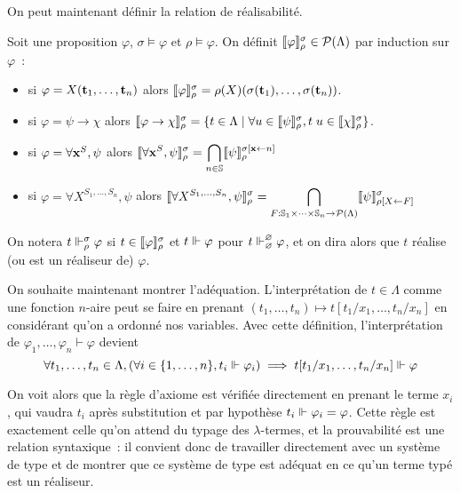 \documentclass{article}
\begin{document}
On peut maintenant définir la relation de réalisabilité.

\begin{defi}
    Soit une proposition $\varphi$, $\sigma\models \varphi$ et $\rho\models \varphi$. On définit $\llbracket \varphi \rrbracket_\rho^\sigma \in \mathcal P(\Lambda)$ par induction sur $\varphi$~:
    \begin{itemize}
        \item si $\varphi = X(\mathbf{t}_1,\ldots,\mathbf{t}_n)$ alors $\llbracket \varphi \rrbracket_\rho^\sigma = \rho(X)(\sigma(\mathbf{t}_1),\ldots,\sigma(\mathbf{t}_n))$.
        \item si $\varphi = \psi \to \chi$ alors $\llbracket \varphi\to\chi \rrbracket_\rho^\sigma = \{t \in \Lambda\mid \forall u \in \llbracket \psi \rrbracket_\rho^\sigma, t\;u \in \llbracket \chi \rrbracket_\rho^\sigma\}$.
        \item si $\varphi = \forall \mathbf{x}^S, \psi$ alors $\displaystyle\llbracket \forall \mathbf{x}^S, \psi \rrbracket_\rho^\sigma = \bigcap_{n \in \mathbb{S}} \llbracket \psi \rrbracket_\rho^{\sigma[\mathbf{x}\leftarrow n]}$
        \item si $\varphi = \forall X^{S_1,\ldots,S_n}, \psi$ alors $\displaystyle\llbracket \forall X^{S_1,\ldots,S_n},\psi \rrbracket_\rho^\sigma = \bigcap_{F : \mathbb{S}_1\times\cdots\times\mathbb{S}_n \to \mathcal P(\Lambda)} \llbracket \psi \rrbracket_{\rho[X\leftarrow F]}^\sigma$
    \end{itemize}

    On notera $t\Vdash_\rho^\sigma \varphi$ si $t\in\llbracket \varphi \rrbracket_\rho^\sigma$ et $t\Vdash\varphi$ pour $t\Vdash_\varnothing^\varnothing\varphi$, et on dira alors que $t$ réalise (ou est un réaliseur de) $\varphi$.
\end{defi}

On souhaite maintenant montrer l'adéquation. L'interprétation de $t\in \Lambda$ comme une fonction $n$-aire peut se faire en prenant $(t_1,\ldots,t_n) \mapsto t[t_1/x_1,\ldots,t_n/x_n]$ en considérant qu'on a ordonné nos variables. Avec cette définition, l'interprétation de $\varphi_1,\ldots,\varphi_n\vdash \varphi$ devient
\[\forall t_1,\ldots,t_n \in \Lambda, (\forall i \in \{1,\ldots,n\}, t_i \Vdash \varphi_i)\implies t[t_1/x_1,\ldots,t_n/x_n]\Vdash\varphi\]

On voit alors que la règle d'axiome est vérifiée directement en prenant le terme $x_i$, qui vaudra $t_i$ après substitution et par hypothèse $t_i\Vdash \varphi_i = \varphi$. Cette règle est exactement celle qu'on attend du typage des $\lambda$-termes, et la prouvabilité est une relation syntaxique~: il convient donc de travailler directement avec un système de type et de montrer que ce système de type est adéquat en ce qu'un terme typé est un réaliseur.
\end{document}
